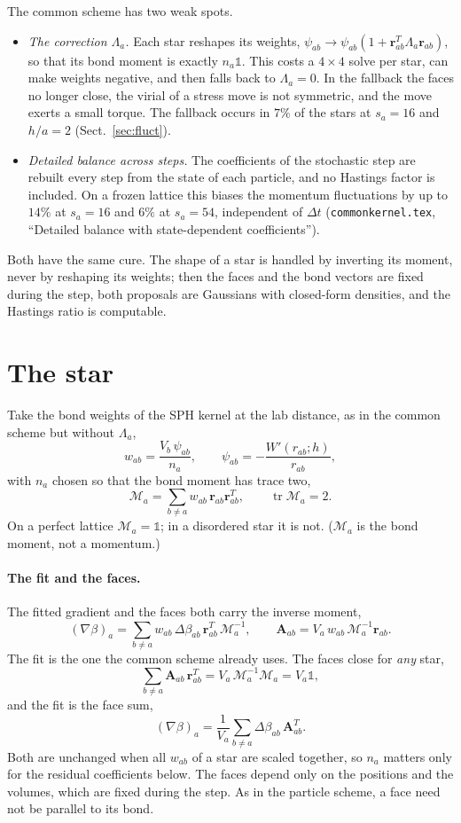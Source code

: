 \documentclass[11pt,aps,preprint,nofootinbib,superscriptaddress,tightenlines]{revtex4-2}
\newcommand{\one}{\mathds{1}}
\def\st{\begin{equation}}
\def\stp{\end{equation}}
\def\Sect#1{Sect.~\ref{#1}}
\def\tr{\operatorname{tr}}
\let\oldparagraph\paragraph
\renewcommand{\paragraph}{\par\bigskip\oldparagraph}
\begin{document}
The common scheme has two weak spots.
\begin{itemize}
\item \emph{The correction $\Lambda_a$.}  Each star reshapes its weights, $\psi_{ab}\to\psi_{ab}(1+\bm r_{ab}^T\Lambda_a\bm r_{ab})$, so that its bond
  moment is exactly $n_a\one$.  This costs a $4\times4$ solve per star, can make weights negative, and then falls back to $\Lambda_a=0$.  In
  the fallback the faces no longer close, the virial of a stress move is not symmetric, and the move exerts a small torque.  The
  fallback occurs in $7\%$ of the stars at $s_a=16$ and $h/a=2$ (\Sect{sec:fluct}).
\item \emph{Detailed balance across steps.}  The coefficients of the stochastic step are rebuilt every step from the state of each particle,
  and no Hastings factor is included.  On a frozen lattice this biases the momentum fluctuations by up to $14\%$ at $s_a=16$ and $6\%$ at
  $s_a=54$, independent of $\Delta t$ (\texttt{commonkernel.tex}, ``Detailed balance with state-dependent coefficients'').
\end{itemize}
Both have the same cure.  The shape of a star is handled by inverting its moment, never by reshaping its weights; then the faces and
the bond vectors are fixed during the step, both proposals are Gaussians with closed-form densities, and the Hastings ratio is
computable.

\section{The star}
\label{sec:star}

Take the bond weights of the SPH kernel at the lab distance, as in the common scheme but without $\Lambda_a$,
\st
w_{ab}=\frac{V_b\,\psi_{ab}}{n_a},\qquad \psi_{ab}=-\frac{W'(r_{ab};h)}{r_{ab}} ,
\stp
with $n_a$ chosen so that the bond moment has trace two,
\st
\mathcal M_a=\sum_{b\neq a}w_{ab}\,\bm r_{ab}\bm r_{ab}^T,\qquad \tr\mathcal M_a=2 .
\label{moment}
\stp
On a perfect lattice $\mathcal M_a=\one$; in a disordered star it is not.  ($\mathcal M_a$ is the bond moment, not a momentum.)

\paragraph{The fit and the faces.}  The fitted gradient and the faces both carry the inverse moment,
\st
(\nabla\beta)_a=\sum_{b\neq a}w_{ab}\,\Delta\beta_{ab}\,\bm r_{ab}^T\,\mathcal M_a^{-1},\qquad
\bm A_{ab}=V_a\,w_{ab}\,\mathcal M_a^{-1}\bm r_{ab} .
\label{faces}
\stp
The fit is the one the common scheme already uses.  The faces close for \emph{any} star,
\st
\sum_{b\neq a}\bm A_{ab}\,\bm r_{ab}^T=V_a\,\mathcal M_a^{-1}\mathcal M_a=V_a\one ,
\label{closure}
\stp
and the fit is the face sum,
\st
(\nabla\beta)_a=\frac1{V_a}\sum_{b\neq a}\Delta\beta_{ab}\,\bm A_{ab}^T .
\stp
Both are unchanged when all $w_{ab}$ of a star are scaled together, so $n_a$ matters only for the residual coefficients below.  The faces
depend only on the positions and the volumes, which are fixed during the step.  As in the particle scheme, a face need not be parallel to
its bond.
\end{document}
